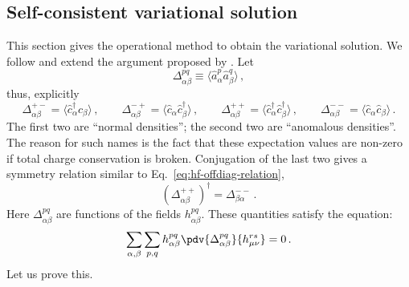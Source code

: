 \subsection{Self-consistent variational solution}\label{subsec:hf-variational-solution}

This section gives the operational method to obtain the variational solution. We follow and extend the argument proposed by \citeauthor{fabrizio2022course} \cite{fabrizio2022course}. Let
\[
	\Delta_{\alpha\beta}^{pq} \equiv \big\langle \hat a_\alpha^p \hat a_\beta^q \big\rangle \, ,
\]
thus, explicitly
\begin{equation}\label{eq:hf-Delta-explicit}
	\Delta_{\alpha\beta}^{+-} = \big\langle \hat c_\alpha^\dagger \hat c_\beta \big\rangle\, ,
	\qquad
	\Delta_{\alpha\beta}^{-+} = \big\langle \hat c_\alpha \hat c_\beta^\dagger \big\rangle\, ,
	\qquad
	\Delta_{\alpha\beta}^{++} = \big\langle \hat c_\alpha^\dagger \hat c_\beta^\dagger \big\rangle\, ,
	\qquad
	\Delta_{\alpha\beta}^{--} = \big\langle \hat c_\alpha \hat c_\beta \big\rangle \, .
\end{equation}
The first two are ``normal densities''; the second two are ``anomalous densities''. The reason for such names is the fact that these expectation values are non-zero if total charge conservation is broken. Conjugation of the last two gives a symmetry relation similar to Eq.~\eqref{eq:hf-offdiag-relation},
\begin{equation}\label{eq:hf-ss-Delta-conj}
	\left( \Delta_{\alpha\beta}^{++} \right)^\dagger = \Delta_{\beta\alpha}^{--} \, .
\end{equation}
Here $\Delta_{\alpha\beta}^{pq}$ are functions of the fields $h_{\alpha\beta}^{pq}$. These quantities satisfy the equation:
\begin{equation}\label{eq:hf-variational-h}
	\sum_{\alpha,\beta} \sum_{p,q} h_{\alpha\beta}^{pq} \pdv{\Delta_{\alpha\beta}^{pq}}{h_{\mu\nu}^{rs}} = 0 \, .
\end{equation}
Let us prove this.

